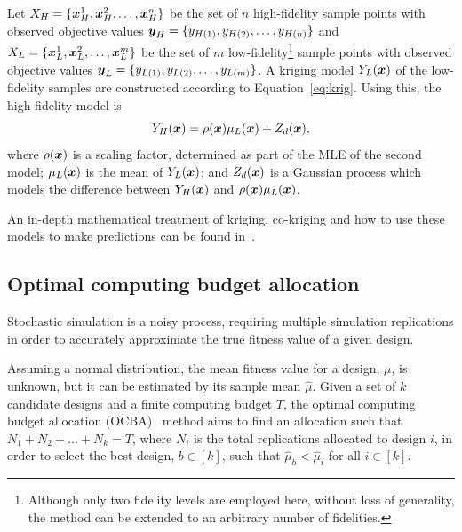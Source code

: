 Let $X_H = \{\boldsymbol{x}_H^1,\boldsymbol{x}_H^2,\dots,\boldsymbol{x}_H^n\}$ be the set of $n$ high-fidelity sample points with observed objective values $\boldsymbol{y}_H = \{y_{H(1)},y_{H(2)},\dots,y_{H(n)}\}$ and $X_L = \{\boldsymbol{x}_L^1,\boldsymbol{x}_L^2,\dots,\boldsymbol{x}_L^m\}$ be the set of $m$ low-fidelity\footnote{Although only two fidelity levels are employed here, without loss of generality, the method can be extended to an arbitrary number of fidelities.} sample points with observed objective values $\boldsymbol{y}_L = \{y_{L(1)},y_{L(2)},\dots,y_{L(m)}\}$. A kriging model $Y_L(\boldsymbol{x})$ of the low-fidelity samples are constructed according to Equation~\ref{eq:krig}. Using this, the high-fidelity model is
\begin{equation}
Y_H(\boldsymbol{x}) = \rho(\boldsymbol{x})\mu_L(\boldsymbol{x}) + Z_d(\boldsymbol{x}),
\end{equation} 
where $\rho(\boldsymbol{x})$ is a scaling factor, determined as part of the MLE of the second model; $\mu_L(\boldsymbol{x})$ is the mean of $Y_L(\boldsymbol{x})$; and $Z_d(\boldsymbol{x})$ is a Gaussian process which models the difference between $Y_H(\boldsymbol{x})$ and $\rho(\boldsymbol{x})\mu_L(\boldsymbol{x})$.

An in-depth mathematical treatment of kriging, co-kriging and how to use these models to make predictions can be found in~\cite{forrester2008engineering,forrester2007multi,kennedy2001bayesian,kennedy2000predicting}.

\subsection{Optimal computing budget allocation}

Stochastic simulation is a noisy process, requiring multiple simulation replications in order to accurately approximate the true fitness value of a given design. 

Assuming a normal distribution, the mean fitness value for a design, $\mu$, is unknown, but it can be estimated by its sample mean $\hat{\mu}$. 
Given a set of $k$ candidate designs and a finite computing budget $T$, the optimal computing budget allocation (OCBA)~\cite{chen2011stochastic} method aims to find an allocation such that ${N_1 + N_2 + \dots + N_k = T}$, where $N_i$ is the total replications allocated to design $i$, in order to select the best design, $b \in [k]$, such that $\hat{\mu}_b < \hat{\mu}_i$ for all $i \in [k]$.

